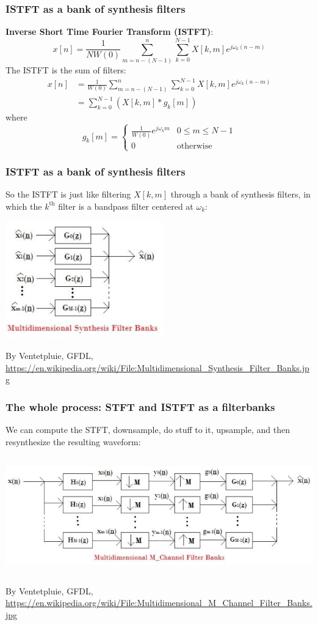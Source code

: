 \documentclass{beamer}
\begin{document}
\begin{frame}
  \frametitle{ISTFT as a bank of synthesis filters}

  {\bf Inverse Short Time Fourier Transform (ISTFT)}:
  \[
  x[n] = \frac{1}{NW(0)}\sum_{m=n-(N-1)}^{n}\sum_{k=0}^{N-1} X[k,m]e^{j\omega_k (n-m)}
  \]
  The ISTFT is the sum of filters:
  \begin{align*}
    x[n] &= \frac{1}{W(0)}\sum_{m=n-(N-1)}^{n}\sum_{k=0}^{N-1} X[k,m]e^{j\omega_k (n-m)}\\
    &= \sum_{k=0}^{N-1} \left( X[k,m] \ast g_k[m]\right)
  \end{align*}
  where
  \[
  g_k[m] = \begin{cases}
    \frac{1}{W(0)}e^{j\omega_k m} & 0\le m\le N-1\\
    0 & \mbox{otherwise}
  \end{cases}
  \]
\end{frame}

\begin{frame}
  \frametitle{ISTFT as a bank of synthesis filters}

  So the ISTFT is just like filtering $X[k,m]$ through a bank of synthesis
  filters, in which the $k^{\textrm{th}}$ filter is a bandpass filter
  centered at $\omega_k$:
  \centerline{\includegraphics[height=2in]{Synthesis_Filter_Banks.jpg}}
  \begin{tiny}
    By Ventetpluie, GFDL,
    \url{https://en.wikipedia.org/wiki/File:Multidimensional_Synthesis_Filter_Banks.jpg}
  \end{tiny}
\end{frame}
  
\begin{frame}
  \frametitle{The whole process: STFT and ISTFT as a filterbanks}

  We can compute the STFT, downsample, do stuff to it, upsample, and then resynthesize the
  resulting waveform:
  \centerline{\includegraphics[height=2in]{Filter_Banks.jpg}}
  \begin{tiny}
    By Ventetpluie, GFDL,
    \url{https://en.wikipedia.org/wiki/File:Multidimensional_M_Channel_Filter_Banks.jpg}
  \end{tiny}
\end{frame}
  
\end{document}
